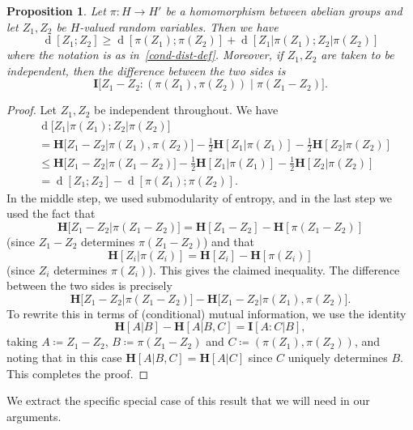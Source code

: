 \documentclass[12pt,reqno,tbtags]{amsart}
\newtheorem{proposition}[theorem]{Proposition}
\theoremstyle{definition}
\theoremstyle{remark}
\renewcommand{\leq}{\leqslant}
\renewcommand{\geq}{\geqslant}
\newcommand{\ent}[1]{\mathbf{H}[#1]}
\newcommand{\I}[1]{\mathbf{I}[#1]}
\newcommand{\bigI}[1]{\mathbf{I}\big[#1\big]}
\newcommand{\bigH}[1]{\mathbf{H}\big[#1\big]}
\newcommand{\dist}[2]{{\operatorname{d}[#1;#2]}} %
\newcommand{\bigdist}[2]{{\operatorname{d}\bigl[#1;#2\bigr]}} %
\numberwithin{equation}{section}
\begin{document}
 \begin{proposition}\label{projections-1}
   Let $\pi \colon H \to H'$ be a homomorphism between abelian groups and let $Z_1,Z_2$ be $H$-valued random variables. Then we have
   \[
     \dist{Z_1}{Z_2} \geq \dist{\pi(Z_1)}{\pi(Z_2)} + \dist{Z_1|\pi(Z_1)}{Z_2 |\pi(Z_2)}
   \]
   where the notation is as in~\eqref{cond-dist-def}.
   Moreover, if $Z_1,Z_2$ are taken to be independent, then the difference between the two sides is
\begin{equation}
\label{mut-info-cond} \bigI{ Z_1 - Z_2 : (\pi(Z_1), \pi(Z_2)) \; | \; \pi(Z_1 - Z_2)}.
\end{equation} \end{proposition}
\begin{proof}
Let $Z_1,Z_2$ be independent throughout.  We have
\begin{align*}
  & \bigdist{Z_1  |\pi(Z_1)}{ Z_2 |\pi(Z_2)} \\
  & = \bigH{ Z_1 - Z_2 | \pi(Z_1),\pi(Z_2)} - \tfrac{1}{2} \ent{Z_1 | \pi(Z_1)} - \tfrac{1}{2}\ent{Z_2 | \pi(Z_2)} \\
  & \leq  \bigH{ Z_1 - Z_2 | \pi(Z_1-Z_2)}  - \tfrac{1}{2} \ent{Z_1 | \pi(Z_1)} - \tfrac{1}{2}\ent{Z_2 | \pi(Z_2)} \\
  & = \dist{Z_1}{Z_2} - \dist{\pi(Z_1)}{\pi(Z_2)}.
\end{align*}
In the middle step, we used submodularity of entropy, and in the last step we used the fact that
\[ \bigH{ Z_1 - Z_2 |  \pi(Z_1-Z_2)} = \ent{Z_1 - Z_2} - \ent{\pi(Z_1-Z_2)}\] (since $Z_1 - Z_2$ determines $\pi(Z_1 - Z_2)$) and that
\[ \ent{Z_i| \pi(Z_i)} = \ent{Z_i} - \ent{\pi(Z_i)}\] (since $Z_i$ determines $\pi(Z_i)$).
This gives the claimed inequality. The difference between the two sides is precisely
\[ \bigH{Z_1 - Z_2  | \pi(Z_1 - Z_2)} - \bigH{Z_1 - Z_2  | \pi(Z_1),\pi(Z_2)}.\]
To rewrite this in terms of (conditional) mutual information, we use the identity
\[ \ent{A|B} - \ent{A | B,C} = \I{A : C | B},\] taking
$A \coloneqq Z_1 - Z_2$, $B \coloneqq \pi(Z_1 - Z_2)$ and $C \coloneqq (\pi(Z_1),\pi(Z_{2}))$, and noting that in this case $\ent{A | B,C} = \ent{A | C}$ since $C$ uniquely determines $B$.
This completes the proof.
\end{proof}

We extract the specific special case of this result that we will need in our arguments.
\end{document}
